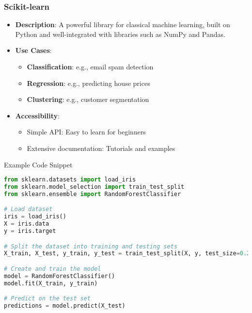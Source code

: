 \documentclass[aspectratio=169]{beamer}
\begin{document}
\begin{frame}[fragile]
    \frametitle{Scikit-learn}
    \begin{itemize}
        \item \textbf{Description}: A powerful library for classical machine learning, built on Python and well-integrated with libraries such as NumPy and Pandas.
        
        \item \textbf{Use Cases}:
        \begin{itemize}
            \item \textbf{Classification}: e.g., email spam detection
            \item \textbf{Regression}: e.g., predicting house prices
            \item \textbf{Clustering}: e.g., customer segmentation
        \end{itemize}
        
        \item \textbf{Accessibility}:
        \begin{itemize}
            \item Simple API: Easy to learn for beginners
            \item Extensive documentation: Tutorials and examples
        \end{itemize}
    \end{itemize}
    
    \begin{block}{Example Code Snippet}
    \begin{lstlisting}[language=Python]
from sklearn.datasets import load_iris
from sklearn.model_selection import train_test_split
from sklearn.ensemble import RandomForestClassifier

# Load dataset
iris = load_iris()
X = iris.data
y = iris.target

# Split the dataset into training and testing sets
X_train, X_test, y_train, y_test = train_test_split(X, y, test_size=0.2)

# Create and train the model
model = RandomForestClassifier()
model.fit(X_train, y_train)

# Predict on the test set
predictions = model.predict(X_test)
    \end{lstlisting}
    \end{block}
\end{frame}
\end{document}
